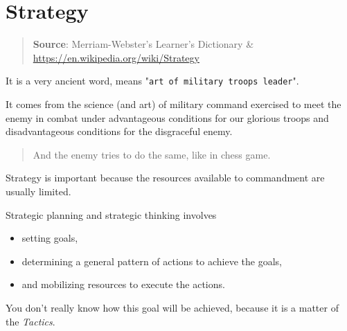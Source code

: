 \section{Strategy}
\label{sec:Strategy}

\begin{quote}
\textbf{Source}: Merriam-Webster's Learner's Dictionary \& \url{https://en.wikipedia.org/wiki/Strategy}                                                  \end{quote} 

 It is a very ancient word, means "\texttt{art of military troops leader}". 

It comes from the science (and art) of military command exercised to meet the enemy in combat under advantageous conditions for our glorious troops and disadvantageous conditions for the disgraceful enemy. 

\begin{quote}
And the enemy tries to do the same, like in chess game.
\end{quote} 

Strategy is important because the resources available to commandment are usually limited.

Strategic planning and strategic thinking involves 
\begin{itemize}
\item 
setting goals, 
\item determining a general pattern of actions to achieve the goals, 
\item and mobilizing resources to execute the actions.                                                \end{itemize}

You don't really know how this goal will be achieved, because it is a matter of the \emph{Tactics}.